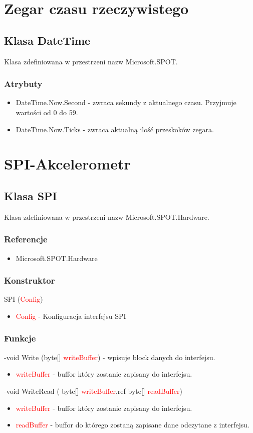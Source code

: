 \documentclass{article}
\begin{document}
\newpage
\section{Zegar czasu rzeczywistego}
\subsection{Klasa DateTime} 
Klasa zdefiniowana w przestrzeni nazw Microsoft.SPOT.
\subsubsection{Atrybuty}
\begin{itemize}
\item DateTime.Now.Second - zwraca sekundy z aktualnego czasu. Przyjmuje wartości od 0 do 59.
\item DateTime.Now.Ticks - zwraca aktualną ilość przeskoków zegara. 
\end{itemize}

\section{SPI-Akcelerometr}
\subsection{Klasa SPI}
Klasa zdefiniowana w przestrzeni nazw Microsoft.SPOT.Hardware. 
\subsubsection{Referencje}
\begin{itemize}
\item Microsoft.SPOT.Hardware
\end{itemize}
\subsubsection{Konstruktor}
SPI (\textcolor{red}{Config})
\begin{itemize}
\item \textcolor{red}{Config} - Konfiguracja interfejsu SPI
\end{itemize}
\subsubsection{Funkcje}
-void Write (byte[] \textcolor{red}{writeBuffer}) - wpisuje block danych do interfejsu.
\begin{itemize}
\item \textcolor{red}{writeBuffer} - buffor który zostanie zapisany do interfejsu.
\end{itemize}
-void WriteRead ( byte[] \textcolor{red}{writeBuffer},ref byte[] \textcolor{red}{readBuffer})
\begin{itemize}
\item \textcolor{red}{writeBuffer} - buffor który zostanie zapisany do interfejsu.
\item \textcolor{red}{readBuffer} - buffor do którego zostaną zapisane dane odczytane z \newline interfejsu.
\end{itemize}
\end{document}
